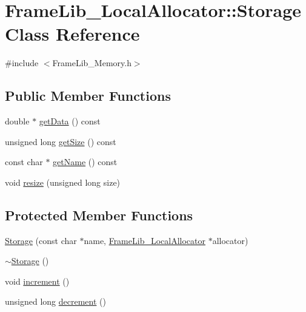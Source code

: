 \hypertarget{class_frame_lib___local_allocator_1_1_storage}{}\section{Frame\+Lib\+\_\+\+Local\+Allocator\+:\+:Storage Class Reference}
\label{class_frame_lib___local_allocator_1_1_storage}


{\ttfamily \#include $<$Frame\+Lib\+\_\+\+Memory.\+h$>$}

\subsection*{Public Member Functions}
\begin{DoxyCompactItemize}
\item 
double $\ast$ \hyperlink{class_frame_lib___local_allocator_1_1_storage_ac6fa172155e0314dda315378a34ab574}{get\+Data} () const
\item 
unsigned long \hyperlink{class_frame_lib___local_allocator_1_1_storage_a4d02d9eb9cab22dab7fe058fab38b00f}{get\+Size} () const
\item 
const char $\ast$ \hyperlink{class_frame_lib___local_allocator_1_1_storage_ac1a8a26c698837c22b87b76999041bf2}{get\+Name} () const
\item 
void \hyperlink{class_frame_lib___local_allocator_1_1_storage_aa4c7c5b51de2b88770a5de6f273cfd26}{resize} (unsigned long size)
\end{DoxyCompactItemize}
\subsection*{Protected Member Functions}
\begin{DoxyCompactItemize}
\item 
\hyperlink{class_frame_lib___local_allocator_1_1_storage_a51742c2b24393570cf3478d0ad7530f8}{Storage} (const char $\ast$name, \hyperlink{class_frame_lib___local_allocator}{Frame\+Lib\+\_\+\+Local\+Allocator} $\ast$allocator)
\item 
\hyperlink{class_frame_lib___local_allocator_1_1_storage_a562e98ee56a7fcff07f90621572688b1}{$\sim$\+Storage} ()
\item 
void \hyperlink{class_frame_lib___local_allocator_1_1_storage_a6589845a528ed83f75785003a32aaeb0}{increment} ()
\item 
unsigned long \hyperlink{class_frame_lib___local_allocator_1_1_storage_af9f0b3faffe38cc459d28dfec814d158}{decrement} ()
\end{DoxyCompactItemize}
